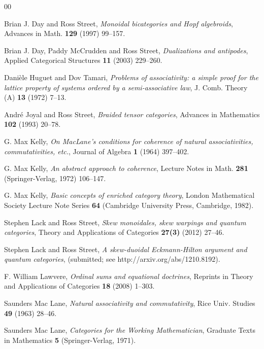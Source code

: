 \documentclass[a4paper,12pt,reqno]{amsart}
\theoremstyle{definition}
\theoremstyle{fact}
\theoremstyle{genquest}
\theoremstyle{step}
\begin{document}
\begin{thebibliography}{00}

 Brian J. Day and Ross Street, \textit{Monoidal bicategories and Hopf algebroids}, Advances in Math. \textbf{129} (1997) 99--157. \label{DaySt1997}

 Brian J. Day, Paddy McCrudden and Ross Street, \textit{Dualizations and antipodes}, Applied Categorical Structures \textbf{11} (2003) 229--260. \label{DMcCS]}

 Dani\`ele Huguet and Dov Tamari, \textit{Problems of associativity: a simple proof for the lattice property of
systems ordered by a semi-associative law}, J. Comb. Theory (A) \textbf{13} (1972) 7--13.\label{HT}  

  Andr\'e Joyal and Ross Street, \textit{Braided tensor categories}, Advances in Mathematics \textbf{102} (1993) 20--78.\label{btc}

 G. Max Kelly, \textit{On MacLane's conditions for coherence of natural associativities, commutativities, etc.}, Journal of Algebra \textbf{1} (1964) 397--402.\label{Kelly1964}

 G. Max Kelly, \textit{An abstract approach to coherence}, Lecture Notes in Math. \textbf{281} (Springer-Verlag, 1972) 106--147.\label{aac}

 G. Max Kelly, \textit{Basic concepts of enriched category theory}, London Mathematical Society Lecture Note Series \textbf{64} (Cambridge University Press, Cambridge, 1982). \label{KellyBook}

 Stephen Lack and Ross Street, \textit{Skew monoidales, skew warpings and quantum categories}, Theory and Applications of Categories \textbf{27(3)} (2012) 27--46.
\label{SkMon}

 Stephen Lack and Ross Street, \textit{A skew-duoidal Eckmann-Hilton argument and quantum categories}, (submitted; see http://arxiv.org/abs/1210.8192).\label{SkEH}

 F. William Lawvere, \textit{Ordinal sums and equational doctrines}, Reprints in Theory and Applications of Categories \textbf{18} (2008) 1--303.\label{osed}

 Saunders Mac Lane, \textit{Natural associativity and commutativity}, Rice Univ. Studies \textbf{49} (1963) 28--46.\label{Rice}

 Saunders Mac Lane, \textit{Categories for the Working Mathematician}, Graduate Texts in Mathematics \textbf{5} (Springer-Verlag, 1971).\label{CWM} 


\end{thebibliography}
\end{document}
